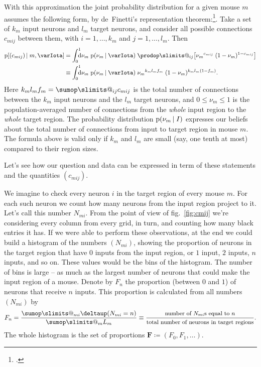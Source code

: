 \documentclass[\ifafour a4paper,12pt,\else a5paper,10pt,\fi%
onecolumn,oneside,article,%
british%
]{memoir}
\makeatletter
\theoremstyle{remark}
\theoremstyle{innote}
\def\sum{\DOTSI\sumop\slimits@}
\def\prod{\DOTSI\prodop\slimits@}
\newcommand*{\citep}{\footcites}
\newcommand*{\delt}{\deltaup}%
\newcommand*{\di}{\mathrm{d}}%
\newcommand*{\defd}{\coloneqq}
\renewcommand*{\le}{\leqslant}%
\newcommand*{\pf}{\mathrm{p}}%
\renewcommand*{\|}[1][]{\nonscript\,#1\vert\nonscript\;\mathopen{}}
\newcommand*{\fig}{fig.}%
\newcommand*{\yI}{\varIota}
\newcommand*{\yc}{c}
\newcommand*{\yf}{f}
\newcommand*{\yN}{N}
\newcommand*{\yF}{\bm{F}}
\makeatother
\begin{document}
With this approximation the joint probability distribution for a given
mouse $m$ assumes the following form, by de~Finetti's representation
theorem:\citep{definetti1930,hewittetal1955,heathetal1976,diaconis1977,diaconisetal1980,dawid2013}.
Take a set of $k_{m}$ input neurons and $l_{m}$ target neurons, and
consider all possible connections $\yc_{mij}$ between them, with
$i=1,\dotsc,k_{m}$ and $j=1,\dotsc,l_{m}$. Then
\begin{equation}
  \label{eq:definetti_ij}
  \begin{split}
  \pf[(\yc_{mij}) \| m, \yI] &=
  \int_{0}^{1}\!\!\!\!\di\nu_{m}\;\pf(\nu_{m} \| \yI)\;
  \prod_{ij}\bigl[
  {\nu_{m}}^{\yc_{mij}}\;(1-\nu_{m})^{1-\yc_{mij}}
  \bigr]
  \\
  &\equiv \int_{0}^{1}\!\!\!\!\di\nu_{m}\;\pf(\nu_{m} \| \yI)\;
  {\nu_{m}}^{k_{m}l_{m}\yf_{m}}\;
  (1-\nu_{m})^{k_{m}l_{m}(1-\yf_{m})}.
\end{split}
\end{equation}
Here $k_{m}l_{m}\yf_{m} = \sum_{ij} \yc_{mij}$ is the total number of
connections between the $k_{m}$ input neurons and the $l_{m}$ target
neurons, and $0\le \nu_{m} \le 1$ is the population-averaged number of
connections from the \emph{whole} input region to the \emph{whole} target
region. The probability distribution $\pf(\nu_{m} \| I)$ expresses our
beliefs about the total number of connections from input to target region
in mouse $m$. The formula above is valid only if $k_{m}$ and $l_{m}$ are
small (say, one tenth at most) compared to their region sizes.



\bigskip


Let's see how our question and data can be expressed in term of these
statements and the quantities $(\yc_{mij})$.

We imagine to check every neuron $i$ in the target region of every mouse
$m$. For each such neuron we count how many neurons from the input region
project to it. Let's call this number $\yN_{mi}$. From the point of view of
\fig~\ref{fig:cmij} we're considering every column from every grid, in
turn, and counting how many black entries it has. If we were able to
perform these observations, at the end we could build a histogram of the
numbers $(\yN_{mi})$, showing the proportion of neurons in the target
region that have $0$ inputs from the input region, or $1$ input, $2$
inputs, $n$ inputs, and so on. These values would be the bins of the
histogram. The number of bins is large -- as much as the largest number of
neurons that could make the input region of a mouse. Denote by $F_{n}$ the
proportion (between $0$ and $1$) of neurons that receive $n$ inputs. This
proportion is calculated from all numbers $(\yN_{mi})$ by
\begin{equation}
  \label{eq:histogram_from_N}
F_{n} =
\frac{\sum_{mi}\delt(\yN_{mi}=n)}{\sum_{m}L_{m}} \equiv
  \frac{\text{\small number of $\yN_{mi}$s equal to $n$}}
  {\text{\small total number of neurons in target regions}}.
\end{equation}
The whole histogram is the set of proportions
$\yF \defd (F_{0}, F_{1}, \dotsc)$.
\end{document}
